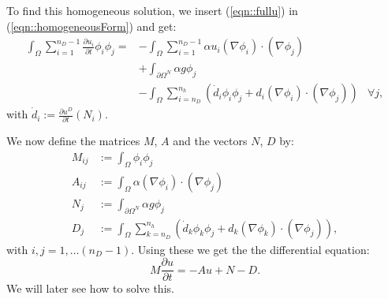 To find this homogeneous solution, we insert (\ref{eqn::fullu}) in (\ref{eqn::homogeneousForm}) and get:
\begin{equation}
\label{eqn::finalDiscreticedForm}
\begin{aligned}
	\int_{\Omega} \sum_{i=1}^{n_D-1} \frac{\partial u_i}{\partial t} \phi_i \phi_j = &-\int_{\Omega} \sum_{i=1}^{n_D-1} \alpha u_i(\nabla \phi_i) \cdot (\nabla \phi_j) \\
	&+ \int_{\partial\Omega^N} \alpha g\phi_j \\
	&-	\int_{\Omega} \sum_{i=n_D}^{n_h}\left( \dot{d}_i \phi_i \phi_j  + d_i(\nabla \phi_i) \cdot (\nabla \phi_j)\right)
	 & \forall j,
\end{aligned}
\end{equation}
with $\dot{d}_i:=\frac{\partial u^D}{\partial t}(N_i)$.

We now define the matrices $M$, $A$ and the vectors $N$, $D$ by:
\begin{align*}
	M_{ij} &:=\int_{\Omega} \phi_i \phi_j \\
	A_{ij} &:=\int_{\Omega} \alpha (\nabla \phi_i) \cdot (\nabla \phi_j) \\
	N_{j} &:=\int_{\partial\Omega^N} \alpha g\phi_j \\
	D_{j} &:=\int_{\Omega} \sum_{k=n_D}^{n_h}\left( \dot{d}_k \phi_k \phi_j  + d_k(\nabla \phi_k) \cdot (\nabla \phi_j)\right),
\end{align*}
with $i,j=1,\dots (n_D-1)$. Using these we get the the differential equation:
\begin{equation}
	\label{eqn::matrixForm}
	M\frac{\partial u}{\partial t} = -A u + N - D.
\end{equation}
We will later see how to solve this.